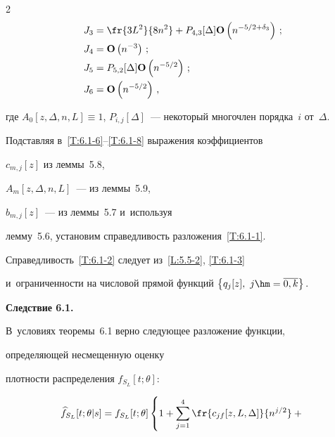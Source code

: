 \begin{multicols}{2}
\begin{align}
J_3&= \fr{3 L^2}{8n^2}+P_{4,3}[\Delta]\Op\left(n^{-5/2+\delta_3}\right)\,;


 \label{T:6.1-8}\\


J_4&=\Op\left(n^{-3}\right)\,;\notag\\


 J_5&=P_{5,2}[\Delta]\Op\left(n^{-5/2}\right)\,;\notag\\


 J_6&= \Op\left(n^{-5/2}\right)\,,\notag


 \end{align}


 где $A_0[z,\Delta,n,L]\equiv 1$, $P_{i,j}[\Delta]$~--- некоторый многочлен порядка~$i$ от~$\Delta$.





 Подставляя в~\eqref{T:6.1-6}--\eqref{T:6.1-8}  выражения коэффициентов


 $c_{m,j}[z]$ из леммы~5.8,


 $A_m[z,\Delta,n,L]$~--- из леммы~5.9,


 $b_{m,j}[z]$~--- из леммы~5.7 и~используя


 лемму~5.6, установим справедливость разложения~\eqref{T:6.1-1}.





 Справедливость~\eqref{T:6.1-2} следует из~\eqref{L:5.5-2}, \eqref{T:6.1-3}


 и~ограниченности на числовой прямой функций $\left\{q_j[z], \ j\hm=\overline{0,k}\right\}.$





\smallskip





\noindent


\textbf{Следствие 6.1.}\


В~условиях теоремы~6.1 верно следующее разложение функции,


  определяющей несмещенную оценку


 плотности распределения $f_{S_L}[t;\theta]$:


  \begin{multline*}


 \widehat{f}_{S_L}[t;\theta|s]=f_{S_L}[t;\theta]


 \left\{\vphantom{  \sum\limits_{j=1}^4} 1


+  \sum\limits_{j=1}^4 \fr{c_{jf}[z,L,\Delta]}{n^{j/2}}+{}\right.\\



\end{multline*}
\end{multicols}
